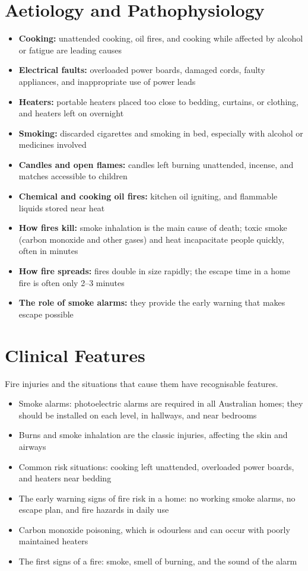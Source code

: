 \section*{Aetiology and Pathophysiology}
\begin{itemize}
    \item \textbf{Cooking:} unattended cooking, oil fires, and cooking while affected by alcohol or fatigue are leading causes
    \item \textbf{Electrical faults:} overloaded power boards, damaged cords, faulty appliances, and inappropriate use of power leads
    \item \textbf{Heaters:} portable heaters placed too close to bedding, curtains, or clothing, and heaters left on overnight
    \item \textbf{Smoking:} discarded cigarettes and smoking in bed, especially with alcohol or medicines involved
    \item \textbf{Candles and open flames:} candles left burning unattended, incense, and matches accessible to children
    \item \textbf{Chemical and cooking oil fires:} kitchen oil igniting, and flammable liquids stored near heat
    \item \textbf{How fires kill:} smoke inhalation is the main cause of death; toxic smoke (carbon monoxide and other gases) and heat incapacitate people quickly, often in minutes
    \item \textbf{How fire spreads:} fires double in size rapidly; the escape time in a home fire is often only 2--3 minutes
    \item \textbf{The role of smoke alarms:} they provide the early warning that makes escape possible
\end{itemize}

\section*{Clinical Features}
Fire injuries and the situations that cause them have recognisable features.
\begin{itemize}
    \item Smoke alarms: photoelectric alarms are required in all Australian homes; they should be installed on each level, in hallways, and near bedrooms
    \item Burns and smoke inhalation are the classic injuries, affecting the skin and airways
    \item Common risk situations: cooking left unattended, overloaded power boards, and heaters near bedding
    \item The early warning signs of fire risk in a home: no working smoke alarms, no escape plan, and fire hazards in daily use
    \item Carbon monoxide poisoning, which is odourless and can occur with poorly maintained heaters
    \item The first signs of a fire: smoke, smell of burning, and the sound of the alarm
\end{itemize}

